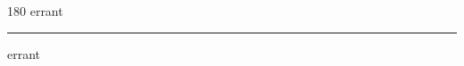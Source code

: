 
\begin{frame}
\begin{center}
\begin{turn}{180}
{\fontsize{2.5cm}{1em}\selectfont errant}
\end{turn}
\vspace{1em}\par  
\hrule
\vspace{1em}\par  
{\fontsize{2.5cm}{1em}\selectfont errant}
\end{center}
\end{frame}
